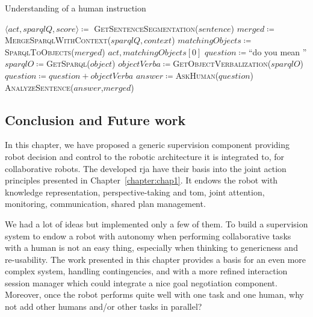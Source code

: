 \documentclass[a4paper,11pt,twoside]{StyleThese}
\begin{document}
\begin{algorithm}[!htb]
	\caption{Understanding of a human instruction}
	\label{chap2:algo:human_instruction}
	\begin{algorithmic}
	\State $\langle act, sparqlQ, score \rangle \coloneqq$ \textsc{GetSentenceSegmentation($sentence$)} 
		\State $merged \coloneqq$\textsc{MergeSparqlWithContext}($sparqlQ,context$)
		\State $matchingObjects \coloneqq$ \textsc{SparqlToObjects}($merged$)
			\State \Return $act,matchingObjects[0]$
		\Else
			\State $question \coloneqq$``do you mean ''
				\State $sparqlO \coloneqq$\textsc{GetSparql($object$)}
				\State $objectVerba \coloneqq$\textsc{GetObjectVerbalization($sparqlO$)}
				\State $question \coloneqq question + objectVerba$
			\EndFor
			\State $answer \coloneqq$\textsc{AskHuman}($question$)
			\State \textsc{AnalyzeSentence}($answer$,$merged$)
		\EndIf
	\EndIf
	\EndFunction
	\end{algorithmic}
\end{algorithm}		


\clearpage
\subsection{Conclusion and Future work}
In this chapter, we have proposed a generic supervision component providing robot decision and control to the robotic architecture it is integrated to, for collaborative robots. The developed \acrfull{rja} have their basis into the joint action principles presented in Chapter~\ref{chapter:chap1}. It endows the robot with knowledge representation, perspective-taking and \acrshort{tom}, joint attention, monitoring, communication, shared plan management.  

We had a lot of ideas but implemented only a few of them. To build a supervision system to endow a robot with autonomy when performing collaborative tasks with a human is not an easy thing, especially when thinking to genericness and re-usability. The work presented in this chapter provides a basis for an even more complex system, handling contingencies, and with a more refined interaction session manager which could integrate a nice goal negotiation component. Moreover, once the robot performs quite well with one task and one human, why not add other humans and/or other tasks in parallel?
\end{document}
